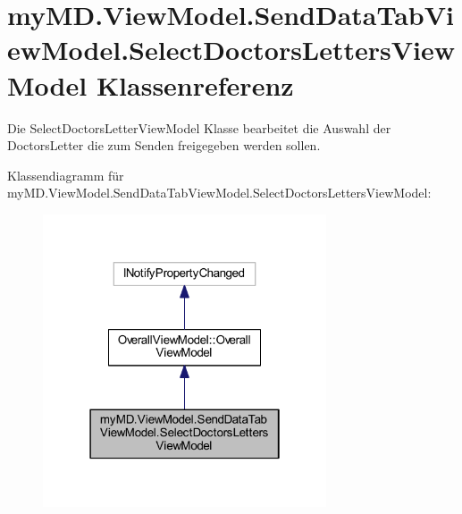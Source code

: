 \hypertarget{classmy_m_d_1_1_view_model_1_1_send_data_tab_view_model_1_1_select_doctors_letters_view_model}{}\section{my\+M\+D.\+View\+Model.\+Send\+Data\+Tab\+View\+Model.\+Select\+Doctors\+Letters\+View\+Model Klassenreferenz}
\label{classmy_m_d_1_1_view_model_1_1_send_data_tab_view_model_1_1_select_doctors_letters_view_model}


Die Select\+Doctors\+Letter\+View\+Model Klasse bearbeitet die Auswahl der Doctors\+Letter die zum Senden freigegeben werden sollen.  




Klassendiagramm für my\+M\+D.\+View\+Model.\+Send\+Data\+Tab\+View\+Model.\+Select\+Doctors\+Letters\+View\+Model\+:\nopagebreak
\begin{figure}[H]
\begin{center}
\leavevmode
\includegraphics[width=238pt]{classmy_m_d_1_1_view_model_1_1_send_data_tab_view_model_1_1_select_doctors_letters_view_model__inherit__graph}
\end{center}
\end{figure}


